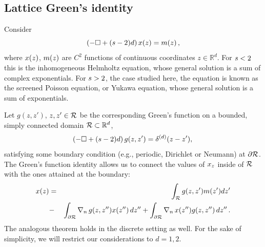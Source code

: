 \documentclass[12pt]{iopart}
\begin{document}
\subsection{Lattice Green's identity}
\label{sect:Green2Dident}

Consider
    \begin{equation}
   (-\Box+(s-2)d)\,x(z)= m(z)
\,,
\label{CatMapContinues}
\end{equation}
where $x(z)$,  $m(z)$  are $C^2$ functions of continuous coordinates
$z\in \mathbb{R}^d$. For $s<2$ this is the inhomogeneous Helmholtz
equation, whose general solution is a sum of complex exponentials. For
$s>2$, the case studied here, the equation is known as the screened
Poisson equation, or Yukawa equation, whose general solution
is a sum of exponentials.

Let $g(z,z')$, $z,z' \in \mathcal{R}$ be the corresponding
Green's function  on  a  bounded, simply connected domain $\mathcal{R}\subset
\mathbb{R}^d$,
\begin{equation}
 (-\Box+(s-2)d)\,g(z,z')=\delta^{(d)}(z-z'),
\,
\label{GreenFunContinues}
\end{equation}
satisfying some boundary condition  (e.g., periodic, Dirichlet or Neumann) at
$\partial \mathcal{R}$.
The Green's function identity allows us to connect the values of  $x_{z}$
inside of $\mathcal{R}$ with the ones attained at the boundary:
\begin{eqnarray}
 x(z) &=& \int_{\mathcal{R}} g(z,z')m(z') dz'\nonumber \\
 &-& \int_{\partial \mathcal{R}} \nabla_n\,g(z,z'')x(z'')\,d z''
  +  \int_{\partial \mathcal{R}} \nabla_n\,x(z'') g(z,z'')\,d z''
\,.
 \label{GreensTheor}
\end{eqnarray}
The analogous theorem holds in the discrete setting as well.  For the
sake of simplicity, we will  restrict our considerations  to  $d=1,2$.
\end{document}
